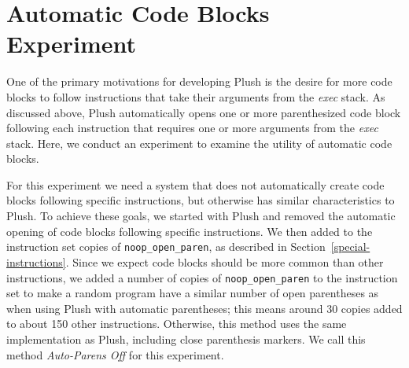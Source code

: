 \documentclass[graybox]{svmult}
\begin{document}






\section{Automatic Code Blocks Experiment}

One of the primary motivations for developing Plush is the desire for more code blocks to follow instructions that take their arguments from the \textit{exec} stack. As discussed above, Plush automatically opens one or more parenthesized code block following each instruction that requires one or more arguments from the \textit{exec} stack. Here, we conduct an experiment to examine the utility of automatic code blocks.

For this experiment we need a system that does not automatically create code blocks following specific instructions, but otherwise has similar characteristics to Plush. To achieve these goals, we started with Plush and removed the automatic opening of code blocks following specific instructions. We then added to the instruction set copies of \texttt{noop\_open\_paren}, as described in Section~\ref{special-instructions}. Since we expect code blocks should be more common than other instructions, we added a number of copies of \texttt{noop\_open\_paren} to the instruction set to make a random program have a similar number of open parentheses as when using Plush with automatic parentheses; this means around 30 copies added to about 150 other instructions. Otherwise, this method uses the same implementation as Plush, including close parenthesis markers. We call this method \textit{Auto-Parens Off} for this experiment.
\end{document}

